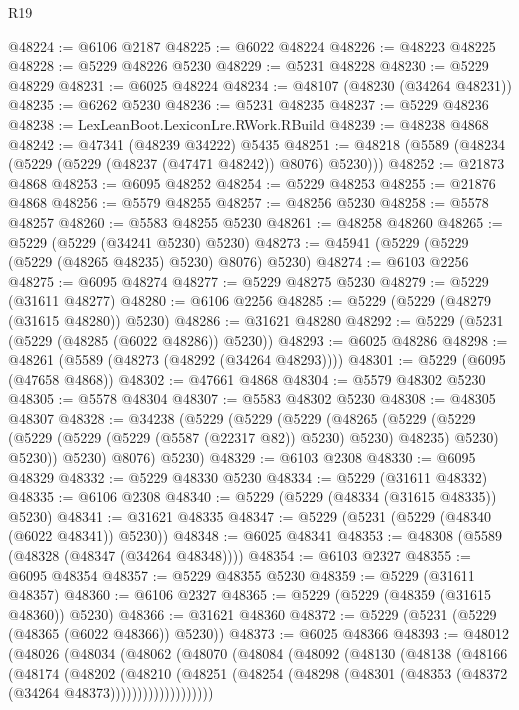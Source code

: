 \begin{lexlean}{R19}
\begin{coremodule}
@48224 := @6106 @2187
@48225 := @6022 @48224
@48226 := @48223 @48225
@48228 := @5229 @48226 @5230
@48229 := @5231 @48228
@48230 := @5229 @48229
@48231 := @6025 @48224
@48234 := @48107 (@48230 (@34264 @48231))
@48235 := @6262 @5230
@48236 := @5231 @48235
@48237 := @5229 @48236
@48238 := LexLeanBoot.LexiconLre.RWork.RBuild
@48239 := @48238 @4868
@48242 := @47341 (@48239 @34222) @5435
@48251 := @48218 (@5589 (@48234 (@5229 (@5229 (@48237 (@47471 @48242)) @8076) @5230)))
@48252 := @21873 @4868
@48253 := @6095 @48252
@48254 := @5229 @48253
@48255 := @21876 @4868
@48256 := @5579 @48255
@48257 := @48256 @5230
@48258 := @5578 @48257
@48260 := @5583 @48255 @5230
@48261 := @48258 @48260
@48265 := @5229 (@5229 (@34241 @5230) @5230)
@48273 := @45941 (@5229 (@5229 (@5229 (@48265 @48235) @5230) @8076) @5230)
@48274 := @6103 @2256
@48275 := @6095 @48274
@48277 := @5229 @48275 @5230
@48279 := @5229 (@31611 @48277)
@48280 := @6106 @2256
@48285 := @5229 (@5229 (@48279 (@31615 @48280)) @5230)
@48286 := @31621 @48280
@48292 := @5229 (@5231 (@5229 (@48285 (@6022 @48286)) @5230))
@48293 := @6025 @48286
@48298 := @48261 (@5589 (@48273 (@48292 (@34264 @48293))))
@48301 := @5229 (@6095 (@47658 @4868))
@48302 := @47661 @4868
@48304 := @5579 @48302 @5230
@48305 := @5578 @48304
@48307 := @5583 @48302 @5230
@48308 := @48305 @48307
@48328 := @34238
    (@5229
      (@5229
        (@5229
          (@48265
            (@5229
              (@5229 (@5229 (@5229 (@5229 (@5587 (@22317 @82)) @5230) @5230) @48235) @5230)
              @5230))
          @5230)
        @8076)
      @5230)
@48329 := @6103 @2308
@48330 := @6095 @48329
@48332 := @5229 @48330 @5230
@48334 := @5229 (@31611 @48332)
@48335 := @6106 @2308
@48340 := @5229 (@5229 (@48334 (@31615 @48335)) @5230)
@48341 := @31621 @48335
@48347 := @5229 (@5231 (@5229 (@48340 (@6022 @48341)) @5230))
@48348 := @6025 @48341
@48353 := @48308 (@5589 (@48328 (@48347 (@34264 @48348))))
@48354 := @6103 @2327
@48355 := @6095 @48354
@48357 := @5229 @48355 @5230
@48359 := @5229 (@31611 @48357)
@48360 := @6106 @2327
@48365 := @5229 (@5229 (@48359 (@31615 @48360)) @5230)
@48366 := @31621 @48360
@48372 := @5229 (@5231 (@5229 (@48365 (@6022 @48366)) @5230))
@48373 := @6025 @48366
@48393 := @48012
    (@48026
      (@48034
        (@48062
          (@48070
            (@48084
              (@48092
                (@48130
                  (@48138
                    (@48166
                      (@48174
                        (@48202
                          (@48210
                            (@48251
                              (@48254
                                (@48298 (@48301 (@48353 (@48372 (@34264 @48373)))))))))))))))))))

\end{coremodule}
\end{lexlean}
